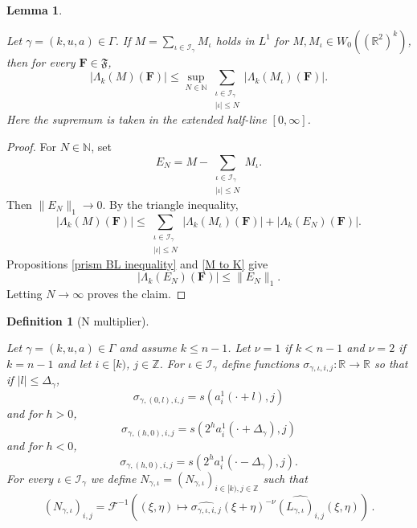 \documentclass[12pt,reqno]{amsart}
\theoremstyle{plain}
\newtheorem{lemma}[theorem]{Lemma}
\newtheorem{definition}[theorem]{Definition}
\numberwithin{equation}{section}
\theoremstyle{remark}
\newcommand{\uses}[1]{}
\newcommand{\usesdefs}[1]{}
\newcommand{\leanok}{}
\newcommand{\lean}[1]{}
\newcommand{\Z}{{\mathbb Z}}
\newcommand{\R}{{\mathbb R}}
\newcommand{\N}{{\mathbb N}}
\begin{document}
\begin{lemma}\label{prism sum le sum prism-L1}
\lean{Auto.prismSumLeSumPrismL1}
\leanok
\uses{prism BL inequality,M to K}\usesdefs{auto:Wiener-space-definition,normalized function tuples,auto:prism-form-definition,geometric parameters,L multiplier,summation-definition}
Let $\gamma=(k,u,a)\in \Gamma$.
If $M=\sum_{\iota\in \mathcal{I}_\gamma} M_\iota$ holds in $L^1$ for $M,M_\iota\in W_0((\R^2)^k)$, then for every $\mathbf{F}\in\mathfrak{F}$,
\begin{equation}\label{auto:prism-form-series-bound} |\Lambda_k(M)(\mathbf{F})| \le \sup_{N\in\mathbb N}\sum_{\substack{\iota\in \mathcal{I}_\gamma\\|\iota|\le N}} |\Lambda_k(M_\iota)(\mathbf{F})|. \end{equation}
Here the supremum is taken in the extended half-line $[0,\infty]$.
\end{lemma}


\begin{proof}
For $N\in\N$, set
\[
E_N=M-\sum_{\substack{\iota\in\mathcal I_\gamma\\|\iota|\le N}}M_\iota.
\]
Then $\|E_N\|_1\to0$. By the triangle inequality,
\[
|\Lambda_k(M)(\mathbf F)|
\le
\sum_{\substack{\iota\in\mathcal I_\gamma\\|\iota|\le N}}
|\Lambda_k(M_\iota)(\mathbf F)|
+|\Lambda_k(E_N)(\mathbf F)|.
\]
Propositions \ref{prism BL inequality} and \ref{M to K} give
\[
|\Lambda_k(E_N)(\mathbf F)|\le\|E_N\|_1.
\]
Letting $N\to\infty$ proves the claim.
\end{proof}


\begin{definition}[N multiplier]\label{N multiplier}\uses{}\usesdefs{geometric parameters,square root Gaussian difference,L multiplier}
\lean{Auto.sigmaMultiplier,Auto.nMultiplier}
  Let $\gamma=(k,u,a)\in \Gamma$ and assume $k\le n-1$.
Let $\nu=1$ if $k<n-1$ and $\nu=2$ if $k=n-1$ and let $i\in [k)$, $j\in \Z$.
For $\iota\in\mathcal{I}_{\gamma}$ define functions $\sigma_{\gamma,\iota,i,j}:\R\to\R$ so that
if $|l|\le \Delta_{\gamma}$,
\begin{equation}\label{auto:sigma-central-band} \sigma_{\gamma,(0,l),i,j} = s(a_i^1(\cdot+l), j) \end{equation}
and for $h>0$,
\begin{equation}\label{auto:sigma-positive-band} \sigma_{\gamma,(h,0),i,j} = s(2^h a_i^1(\cdot+\Delta_{\gamma}), j) \end{equation}
and for $h<0$,
\begin{equation}\label{auto:sigma-negative-band} \sigma_{\gamma,(h,0),i,j} = s(2^h a_i^1(\cdot-\Delta_{\gamma}), j). \end{equation}
For every $\iota\in\mathcal{I}_{\gamma}$ we define $N_{\gamma,\iota}= (N_{\gamma,\iota})_{i\in [k),j\in \Z}$ such that
\begin{equation}\label{auto:N-kernel-definition}
 (N_{\gamma,\iota})_{i,j} =
 \mathcal F^{-1}((\xi,\eta) \mapsto \widehat{\sigma_{\gamma,\iota,i,j}}(\xi+\eta)^{-\nu}\widehat{(L_{\gamma,\iota})_{i,j}}(\xi,\eta))\, .
\end{equation}
\end{definition}
\end{document}
